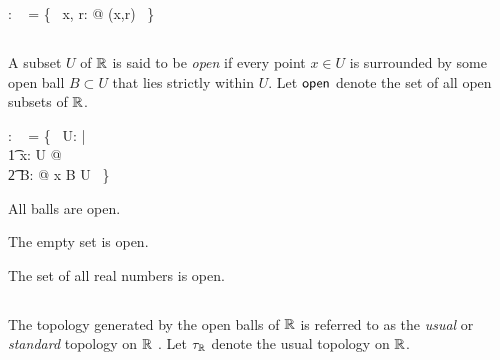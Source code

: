 \documentclass[11pt, oneside]{article}
\begin{document}
\begin{axdef}
	\ballsR: \family~\R
\where
	\ballsR = \{~ x, r: \R @ \ballR(x,r) ~\}
\end{axdef}

\subsection{}

A subset $U$ of $\mathbb{R}$ is said to be {\it open} if every point $x \in U$ is surrounded by some open ball $B \subset U$ that lies
strictly within $U$.
Let $\mathsf{open}$ denote the set of all open subsets of $\mathbb{R}$.

\begin{axdef}
	\openR: \family~\R
\where
	\openR = \{~ U:  \power \R | \\
	\t1	\forall x: U @ \\
	\t2		\exists B: \ballsR @ x \in B \subset U ~\}
\end{axdef}

\begin{remark}
All balls are open.

\begin{zed}
	\ballsR \subset \openR
\end{zed}

\end{remark}

\begin{remark}
The empty set is open.

\begin{zed}
	\emptyset \in \openR
\end{zed}

\end{remark}

\begin{remark}
The set of all real numbers is open.

\begin{zed}
	\R \in \openR
\end{zed}

\end{remark}

\subsection{}

The topology generated by the open balls of $\mathbb{R}$ is referred to as the {\it usual} or {\it standard} topology on $\mathbb{R}$ .
Let $\tau_{\mathbb{R}}$ denote the usual topology on $\mathbb{R}$.
\end{document}
